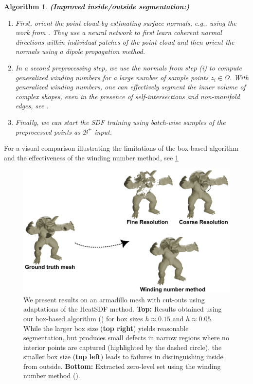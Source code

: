 \documentclass[12pt,openany]{book}
\theoremstyle{plainnormal}
\newtheorem{algorithm}[theorem]{Algorithm}
\theoremstyle{remark}
\begin{document}
    \begin{algorithm}\label{improvedInsideOutside}\textbf{(Improved inside/outside segmentation:)}
        \begin{enumerate}
            \item First, orient the point cloud by estimating surface normals, e.g., using the work from \cite{Metzer_2021}. They use a neural network to first learn coherent normal directions within individual patches of the point cloud and then orient the normals using a dipole propagation method. 
            \item In a second preprocessing step, we use the normals from step (i) to compute generalized winding numbers for a large number of sample points $z_i\in \Omega$. With generalized winding numbers, one can effectively segment the inner volume of complex shapes, even in the presence of self-intersections and non-manifold edges, see \cite{10.1145/2461912.2461916}.
            \item Finally, we can start the SDF training using batch-wise samples of the preprocessed points as $\mathcal{B}^\pm$ input.
        \end{enumerate}
    \end{algorithm} 
 
    For a visual comparison illustrating the limitations of the box-based algorithm and the effectiveness of the winding number method, see \cref{Winding_fig}
\begin{figure}[!t]
    \centering
    \includegraphics[width=\linewidth]{Figures/WindingNumberFig.pdf}
    \caption{We present results on an armadillo mesh with cut-outs using adaptations of the HeatSDF method. \textbf{Top:} Results obtained using our box-based algorithm () for box sizes $h \approx 0.15$ and $h \approx 0.05$. While the larger box size (\textbf{top right}) yields reasonable segmentation, but produces small defects in narrow regions where no interior points are captured (highlighted by the dashed circle), the smaller box size (\textbf{top left}) leads to failures in distinguishing inside from outside. \textbf{Bottom:} Extracted zero-level set using the winding number method ().
}
    \label{Winding_fig}
\end{figure}
\end{document}
